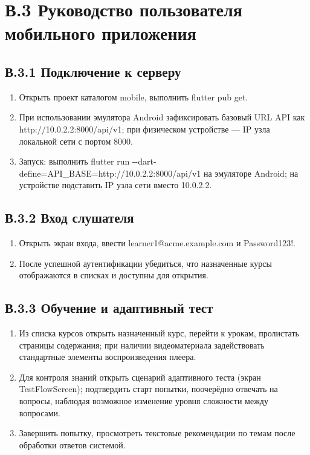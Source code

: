 \section*{В.3 Руководство пользователя мобильного приложения}

\subsection*{В.3.1 Подключение к серверу}

\begin{enumerate}
  \item Открыть проект каталогом mobile, выполнить flutter pub get.
  \item При использовании эмулятора Android зафиксировать базовый URL API как http://10.0.2.2:8000/api/v1; при физическом устройстве --- IP узла локальной сети с портом 8000.
  \item Запуск: выполнить flutter run {-}{-}dart-define=API\_BASE=http://10.0.2.2:8000/api/v1 на эмуляторе Android; на устройстве подставить IP узла сети вместо 10.0.2.2.
\end{enumerate}

\subsection*{В.3.2 Вход слушателя}

\begin{enumerate}
  \item Открыть экран входа, ввести learner1@acme.example.com и Password123!.
  \item После успешной аутентификации убедиться, что назначенные курсы отображаются в списках и доступны для открытия.
\end{enumerate}

\subsection*{В.3.3 Обучение и адаптивный тест}

\begin{enumerate}
  \item Из списка курсов открыть назначенный курс, перейти к урокам, пролистать страницы содержания; при наличии видеоматериала задействовать стандартные элементы воспроизведения плеера.
  \item Для контроля знаний открыть сценарий адаптивного теста (экран TestFlowScreen); подтвердить старт попытки, поочерёдно отвечать на вопросы, наблюдая возможное изменение уровня сложности между вопросами.
  \item Завершить попытку, просмотреть текстовые рекомендации по темам после обработки ответов системой.
\end{enumerate}

